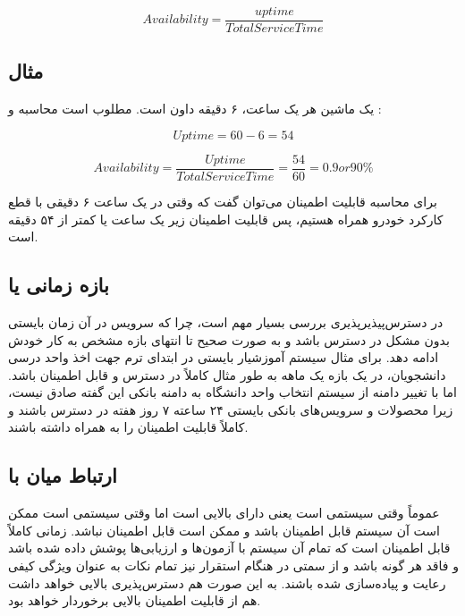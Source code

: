 \documentclass[a4paper]{article}
\begin{document}
\begin{equation}
    Availability = \frac{uptime}{Total Service Time}
\end{equation}

\subsection*{مثال}

یک ماشین هر یک ساعت، ۶ دقیقه داون است. مطلوب است محاسبه  و
:

\begin{equation}
    Uptime = 60-6 = 54
\end{equation}

\begin{equation}
    Availability = \frac{Uptime}{Total Service Time} = \frac{54}{60} = 0.9 or 90\%
\end{equation}

برای محاسبه قابلیت اطمینان می‌توان گفت که وقتی در یک ساعت ۶ دقیقی با قطع کارکرد
خودرو همراه هستیم، پس قابلیت اطمینان زیر یک ساعت یا کمتر از ۵۴ دقیقه است.

\subsection{بازه زمانی یا }

در دسترس‌پیذیرپذیری بررسی  بسیار مهم است، چرا که سرویس در آن زمان
بایستی بدون مشکل در دسترس باشد و به صورت صحیح تا انتهای بازه مشخص  به کار خودش ادامه دهد. برای مثال سیستم آموزشیار بایستی در ابتدای ترم جهت
اخذ واحد درسی دانشجویان، در یک بازه یک ماهه به طور مثال کاملاً در دسترس و قابل
اطمینان باشد. اما با تغییر دامنه از سیستم انتخاب واحد دانشگاه به دامنه بانکی این
گفته صادق نیست، زیرا محصولات و سرویس‌‌های بانکی بایستی ۲۴ ساعته ۷ روز هفته در
دسترس باشند و کاملاً قابلیت اطمینان را به همراه داشته باشند.

\subsection{ارتباط میان  با }

عموماً وقتی سیستمی  است یعنی دارای  بالایی است اما
وقتی سیستمی  است ممکن است آن سیستم قابل اطمینان باشد و ممکن است
قابل اطمینان نباشد. زمانی کاملاً قابل اطمینان است که تمام آن سیستم با آزمون‌ها و
ارزیابی‌ها پوشش داده شده باشد و فاقد هر گونه  باشد و از سمتی در هنگام
استقرار نیز تمام نکات  به عنوان ویژگی کیفی رعایت و پیاده‌سازی
شده باشند. به این صورت هم دسترس‌پذیری بالایی خواهد داشت هم از قابلیت اطمینان
بالایی برخوردار خواهد بود.
\end{document}
